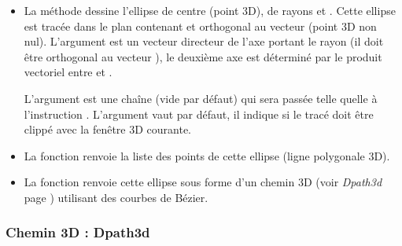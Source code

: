\begin{itemize}
    \item La méthode  dessine l'ellipse de centre  (point 3D), de rayons  et . Cette ellipse est tracée dans le plan contenant  et orthogonal au vecteur  (point 3D non nul). L'argument  est un vecteur directeur de l'axe portant le rayon  (il doit être orthogonal au vecteur ), le deuxième axe est déterminé par le produit vectoriel entre  et .
    
    L'argument  est une chaîne (vide par défaut) qui sera passée telle quelle à l'instruction \drawcmd . L'argument  vaut \false par défaut, il indique si le tracé doit être clippé avec la fenêtre 3D courante.
    
    \item La fonction  renvoie la liste des points de cette ellipse (ligne polygonale 3D). 
    
    \item La fonction  renvoie cette ellipse sous forme d'un chemin 3D (voir \emph{Dpath3d} page \pageref{Dpath3d}) utilisant des courbes de Bézier.
\end{itemize}

    
\subsubsection{Chemin 3D : Dpath3d}\label{Dpath3d}

